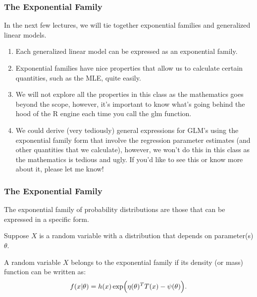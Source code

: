 \documentclass{beamer}
\begin{document}
\begin{frame}
\frametitle{The Exponential Family}

In the next few lectures, we will tie together exponential families and generalized linear models. 

\begin{enumerate}
\item Each generalized linear model can be expressed as an exponential family. 
\item Exponential families have nice properties that allow us to calculate certain quantities, such as the MLE, quite easily. 
\item We will not explore all the properties in this class as the mathematics goes beyond the scope, however, it's important to know what's going behind the hood of the R engine each time you call the glm function. 
\item We could derive (very tediously) general expressions for GLM's using the exponential family form that involve the regression parameter estimates (and other quantities that we calculate), however, we won't do this in this class as the mathematics is tedious and ugly. If you'd like to see this or know more about it, please let me know! 
\end{enumerate}



\end{frame}

\begin{frame}
\frametitle{The Exponential Family}
The exponential family of probability distributions are those that
can be expressed in a specific form.

\vspace*{1em}
Suppose $X$ is a random variable with a distribution that depends on parameter(s) $\theta$. 

\vspace*{1em}
A random variable $X$ belongs to the exponential family if its density (or mass) function can be written as:
\[
f(x|\theta) = h(x)\exp\Bigl(\eta(\theta)^T T(x) - \psi(\theta)\Bigr).
\]


\end{frame}
\end{document}
